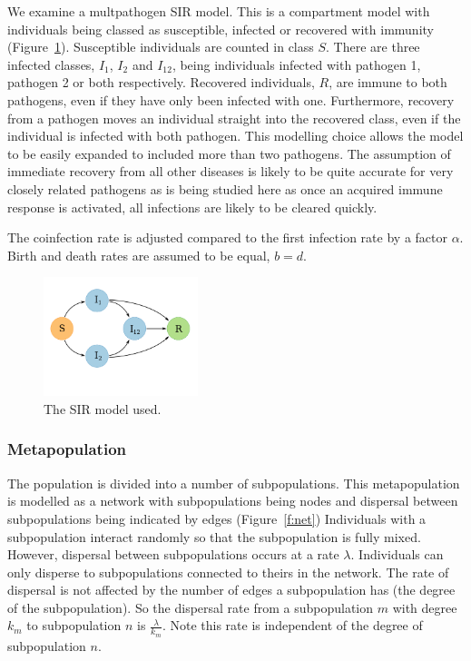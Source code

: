 We examine a multpathogen SIR model. 
This is a compartment model with individuals being classed as susceptible, infected or recovered with immunity (Figure~\ref{f:sir}).
Susceptible individuals are counted in class $S$.
There are three infected classes, $I_1$, $I_2$ and $I_{12}$, being individuals infected with pathogen 1, pathogen 2 or both respectively.
Recovered individuals, $R$, are immune to both pathogens, even if they have only been infected with one.
Furthermore, recovery from a pathogen moves an individual straight into the recovered class, even if the individual is infected with both pathogen.
This modelling choice allows the model to be easily expanded to included more than two pathogens.
The assumption of immediate recovery from all other diseases is likely to be quite accurate for very closely related pathogens as is being studied here as once an acquired immune response is activated, all infections are likely to be cleared quickly.

The coinfection rate is adjusted compared to the first infection rate by a factor $\alpha$.
Birth and death rates are assumed to be equal, $b = d$.


\begin{figure}[b]
\centering
  \includegraphics[width=0.4\textwidth]{imgs/SIRoption1.pdf}
  \caption{The SIR model used.}
  \label{f:sir}
\end{figure}

\subsubsection{Metapopulation}

The population is divided into a number of subpopulations.
This metapopulation is modelled as a network with subpopulations being nodes and dispersal between subpopulations being indicated by edges (Figure~\ref{f:net})
Individuals with a subpopulation interact randomly so that the subpopulation is fully mixed.
However, dispersal between subpopulations occurs at a rate $\lambda$.
Individuals can only disperse to subpopulations connected to theirs in the network.
The rate of dispersal is not affected by the number of edges a subpopulation has (the degree of the subpopulation).
So the dispersal rate from a subpopulation $m$ with degree $k_m$ to subpopulation $n$ is $\frac{\lambda}{k_m}$.
Note this rate is independent of the degree of subpopulation $n$.


